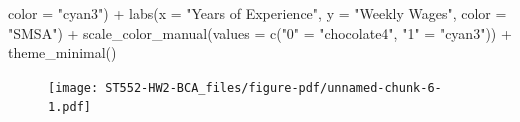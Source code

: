 \documentclass[
  letterpaper,
  DIV=11,
  numbers=noendperiod]{scrartcl}
\newenvironment{Shaded}{}{}
\newcommand{\AttributeTok}[1]{\textcolor[rgb]{0.84,0.60,0.13}{#1}}
\newcommand{\FunctionTok}[1]{\textcolor[rgb]{0.41,0.62,0.42}{#1}}
\newcommand{\NormalTok}[1]{\textcolor[rgb]{0.24,0.22,0.21}{#1}}
\newcommand{\OtherTok}[1]{\textcolor[rgb]{0.41,0.62,0.42}{#1}}
\newcommand{\SpecialCharTok}[1]{\textcolor[rgb]{0.69,0.38,0.53}{#1}}
\newcommand{\StringTok}[1]{\textcolor[rgb]{0.60,0.59,0.10}{#1}}
\begin{document}
\begin{Shaded}
\begin{Highlighting}[]
            \AttributeTok{color =} \StringTok{"cyan3"}\NormalTok{) }\SpecialCharTok{+}
  \FunctionTok{labs}\NormalTok{(}\AttributeTok{x =} \StringTok{"Years of Experience"}\NormalTok{, }\AttributeTok{y =} \StringTok{"Weekly Wages"}\NormalTok{, }\AttributeTok{color =} \StringTok{"SMSA"}\NormalTok{) }\SpecialCharTok{+}
  \FunctionTok{scale\_color\_manual}\NormalTok{(}\AttributeTok{values =} \FunctionTok{c}\NormalTok{(}\StringTok{"0"} \OtherTok{=} \StringTok{"chocolate4"}\NormalTok{, }
                                \StringTok{"1"} \OtherTok{=} \StringTok{"cyan3"}\NormalTok{)) }\SpecialCharTok{+}
  \FunctionTok{theme\_minimal}\NormalTok{()}
\end{Highlighting}
\end{Shaded}

\begin{figure}[H]

{\centering \texttt{[image: ST552-HW2-BCA\_files/figure-pdf/unnamed-chunk-6-1.pdf]}

}

\end{figure}
\end{document}
